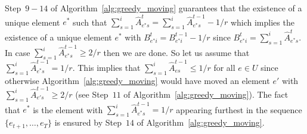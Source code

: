 \noindent Step~$9-14$ of Algorithm~\ref{alg:greedy_moving} guarantees that the existence of a unique element $e^\ast$ such that $\sum_{s=1}^i \hat{A}_{e^\ast s}^t = \sum_{s=1}^i \hat{A}_{e^\ast s}^{t-1} -1/r$ which implies the existence of a unique element $e^\ast$ with $B_{e^\ast i}^t =  B_{e^\ast i}^{t-1} - 1/r$ since $B_{e^\ast i}^t =\sum_{s=1}^i\hat{A}_{e^\ast s}^{t}$. In case $\sum_{s=1}^i \hat{A}_{e^\ast s}^{t-1} \geq 2/r$ then we are done. So let us assume that $\sum_{s=1}^i \hat{A}_{e^\ast s}^{t-1} = 1/r$. This implies that $\sum_{s=1}^i \hat{A}_{e s}^{t-1} \leq 1/r$ for all $e \in U$ since otherwise Algorithm~\ref{alg:greedy_moving} would have moved an element $e'$ with $\sum_{s=1}^i \hat{A}_{e' s}^{t-1} \geq 2/r$ (see Step~$11$ of Algorithm~\ref{alg:greedy_moving}). The fact that $e^\ast$ is the element with $\sum_{s=1}^i \hat{A}_{e^\ast s}^{t-1} = 1/r$ appearing furthest in the sequence $\{e_{t+1},\ldots,e_T\}$ is ensured by Step~$14$ of Algorithm~\ref{alg:greedy_moving}.

